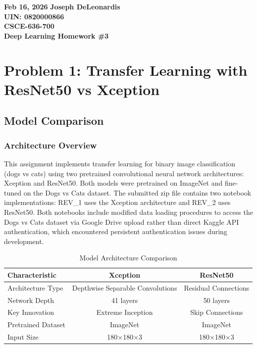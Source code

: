 \documentclass[11pt]{article}
\begin{document}
\noindent
\textbf{Feb 16, 2026} \hfill \textbf{Joseph DeLeonardis} \\
\textbf{UIN: 0820000866} \\
\textbf{CSCE-636-700} \\
\textbf{Deep Learning Homework \#3}

\section*{Problem 1: Transfer Learning with ResNet50 vs Xception}

\subsection*{Model Comparison}

\subsubsection*{Architecture Overview}

This assignment implements transfer learning for binary image classification (dogs vs cats) using two pretrained convolutional neural network architectures: Xception and ResNet50. Both models were pretrained on ImageNet and fine-tuned on the Dogs vs Cats dataset. The submitted zip file contains two notebook implementations: REV\_1 uses the Xception architecture and REV\_2 uses ResNet50. Both notebooks include modified data loading procedures to access the Dogs vs Cats dataset via Google Drive upload rather than direct Kaggle API authentication, which encountered persistent authentication issues during development.

\begin{table}[h]
\centering
\caption{Model Architecture Comparison}
\begin{tabular}{lcc}
\toprule
\textbf{Characteristic} & \textbf{Xception} & \textbf{ResNet50} \\
\midrule
Architecture Type & Depthwise Separable Convolutions & Residual Connections \\
Network Depth & 41 layers & 50 layers \\
Key Innovation & Extreme Inception & Skip Connections \\
Pretrained Dataset & ImageNet & ImageNet \\
Input Size & 180×180×3 & 180×180×3 \\
\bottomrule
\end{tabular}
\end{table}
\end{document}
